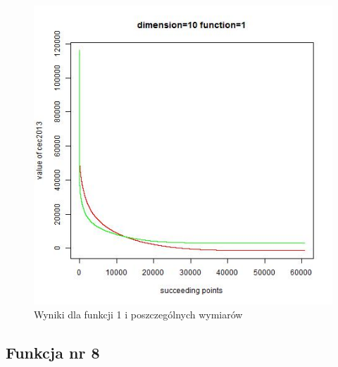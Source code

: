 \documentclass{article}
\begin{document}
\begin{figure}[!htb]
\endminipage\hfill
\includegraphics[scale=0.40]{dim_10__func_1}
\caption{Wyniki dla funkcji 1 i poszczególnych wymiarów}
\end{figure}
\newpage

\subsection{Funkcja nr 8}
\end{document}
